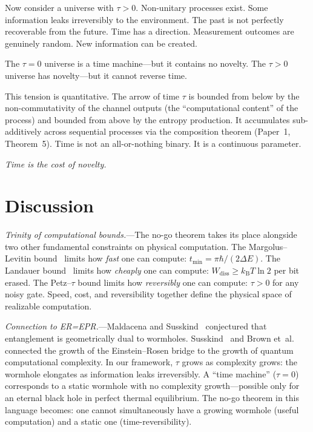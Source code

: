 \documentclass[prl,twocolumn,superscriptaddress,longbibliography,floatfix]{revtex4-2}
\newcommand{\kB}{k_{\mathrm{B}}}
\newcommand{\tauasym}{\tau}
\begin{document}
Now consider a universe with $\tauasym > 0$.  Non-unitary processes
exist.  Some information leaks irreversibly to the environment.  The
past is not perfectly recoverable from the future.  Time has a
direction.  Measurement outcomes are genuinely random.  New
information can be created.

The $\tauasym = 0$ universe is a time machine---but it contains no
novelty.  The $\tauasym > 0$ universe has novelty---but it cannot
reverse time.

This tension is quantitative.  The arrow of time $\tauasym$ is bounded
from below by the non-commutativity of the channel outputs (the
``computational content'' of the process) and bounded from above by
the entropy production.  It accumulates sub-additively across
sequential processes via the composition theorem (Paper~1,
Theorem~5).  Time is not an all-or-nothing binary.  It is a continuous
parameter.

\emph{Time is the cost of novelty.}

\section{Discussion}
\label{sec:discussion}

\emph{Trinity of computational bounds.}---The no-go theorem takes its
place alongside two other fundamental constraints on physical
computation.  The Margolus--Levitin bound~\cite{Margolus1998} limits
how \emph{fast} one can compute:
$t_{\min} = \pi\hbar/(2\Delta E)$.  The Landauer
bound~\cite{Landauer1961} limits how \emph{cheaply} one can compute:
$W_{\mathrm{diss}} \geq \kB T \ln 2$ per bit erased.  The Petz--$\tauasym$
bound limits how \emph{reversibly} one can compute:
$\tauasym > 0$ for any noisy gate.  Speed, cost, and reversibility
together define the physical space of realizable computation.

\emph{Connection to ER=EPR.}---Maldacena and
Susskind~\cite{Maldacena2013} conjectured that entanglement is
geometrically dual to wormholes.  Susskind~\cite{Susskind2016} and
Brown et~al.~\cite{Brown2016} connected the growth of the
Einstein--Rosen bridge to the growth of quantum computational
complexity.  In our framework, $\tauasym$ grows as complexity grows:
the wormhole elongates as information leaks irreversibly.  A
``time machine'' ($\tauasym = 0$) corresponds to a static wormhole
with no complexity growth---possible only for an eternal black hole
in perfect thermal equilibrium.  The no-go theorem in this language
becomes: one cannot simultaneously have a growing wormhole (useful
computation) and a static one (time-reversibility).
\end{document}
